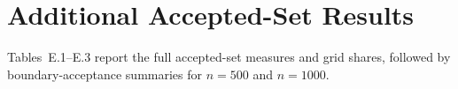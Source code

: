 \section{Additional Accepted-Set Results}

Tables~E.1--E.3 report the full accepted-set measures and grid shares, followed by boundary-acceptance summaries for $n=500$ and $n=1000$.


